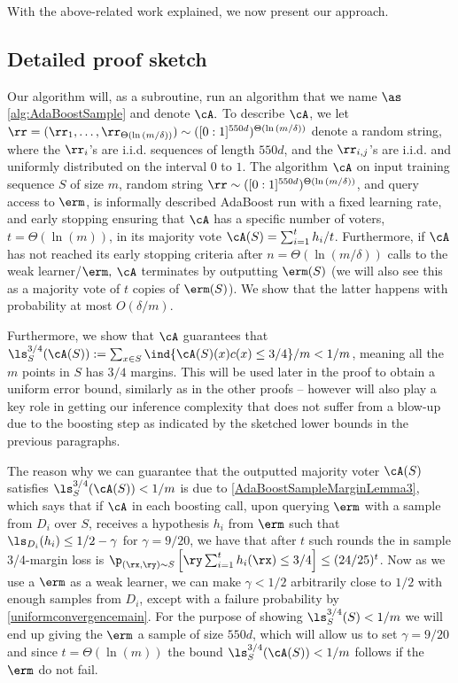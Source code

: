 With the above-related work explained, we now present our approach.
\vspace{-0.3cm}

\subsection{Detailed proof sketch}

Our algorithm will, as a subroutine, run an algorithm that we name $ \as $ \cref{alg:AdaBoostSample} and denote $ \cA. $ To describe $ \cA $, we let $  \rr=(\rr_{1},\ldots,\rr_{\Theta(\ln{(m/\delta )})}) \sim([0:1]^{550d})^{\Theta(\ln{(m/\delta )})} $ denote a random string, where the $ \rr_{i} $'s are i.i.d. sequences of length $ 550d $, and the $ \rr_{i,j} $'s are i.i.d. and uniformly distributed on the interval $ 0 $ to $ 1 $. The algorithm $ \cA$ on input training sequence $S$ of size $m$, random string $ \rr \sim([0:1]^{550d})^{\Theta(\ln{(m/\delta )})}$, and query access to $\erm$, is informally described AdaBoost run with a fixed learning rate, and early stopping ensuring that $ \cA $  has a specific number of voters, $t= \Theta(\ln{\left(m \right)}) $, in its majority vote $\cA(S)= \sum_{i=1}^{t} h_i/t $. Furthermore, if $ \cA $ has not reached its early stopping criteria after $ n=\Theta(\ln(m/\delta)) $ calls to the weak learner/$ \erm,$  $ \cA $  terminates by outputting $ \erm(S) $ (we will also see this as a majority vote of $ t $ copies of $ \erm(S) $). We show that the latter happens with probability at most $O(\delta/m)$. 

Furthermore, we show that $ \cA $ guarantees that $\ls_{S}^{3/4}(\cA(S)):= \sum_{x\in S} \ind\{\cA(S)(x)c(x)\leq 3/4 \}/m <1/m $, meaning all the $m$ points in $ S $  has $ 3/4 $  margins. This will be used later in the proof to obtain a uniform error bound, similarly as in the other proofs -- however will also play a key role in getting our inference complexity that does not suffer from a blow-up due to the boosting step as indicated by the sketched lower bounds in the previous paragraphs.

The reason why we can guarantee that the outputted majority voter $ \cA(S) $ satisfies
$ \ls_{S}^{3/4}(\cA(S)) <1/m $ is due to \cref{AdaBoostSampleMarginLemma3}, which says that if $ \cA $ in each boosting call, upon querying $ \erm $  with a sample from $ D_{i} $ over $ S $, receives a hypothesis $ h_{i} $ from $ \erm $ such that  $ \ls_{D_{i}}(h_{i})\leq 1/2-\gamma  $ for $ \gamma=9/20 $,  we have that after $ t $ such rounds the in sample 3/4-margin loss is  $\p_{(\rx,\ry)\sim S}\left[\ry \sum_{i=1}^{t} h_{i}(\rx)\leq 3/4 \right]\leq (24/25)^{t}$. Now as we use a $ \erm $ as a weak learner, we can make $ \gamma <1/2$  arbitrarily close to $ 1/2 $  with enough samples from $ D_{i} $, except with a failure probability by \cref{uniformconvergencemain}. For the purpose of showing $ \ls_{S}^{3/4}(S)<1/{m} $ we will end up giving the $ \erm $ a sample of size $ 550d $, which will allow us to set $ \gamma=9/20 $ and since $t= \Theta(\ln{\left(m\right)}) $ the bound $ \ls_{S}^{3/4}(\cA(S))<1/m $ follows if the $ \erm $ do not fail. 

